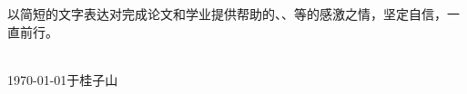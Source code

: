 
\acknowledgements


以简短的文字表达对完成论文和学业提供帮助的、、等的感激之情，坚定自信，一直前行。


\begin{signature}
  \blind{} \\
  \today 于桂子山
\end{signature}